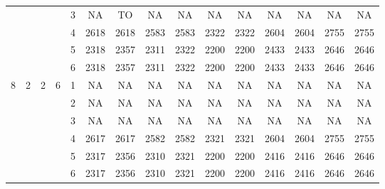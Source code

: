 \begin{longtable}{|c|c|c|c|c|c c|c c|c c|c c|c c|}
 & & & & 3 & NA & TO & NA & NA & NA & NA & NA & NA & NA & NA \\
 & & & & 4 & 2618 & 2618 & 2583 & 2583 & 2322 & 2322 & 2604 & 2604 & 2755 & 2755 \\
 & & & & 5 & 2318 & 2357 & 2311 & 2322 & 2200 & 2200 & 2433 & 2433 & 2646 & 2646 \\
 & & & & 6 & 2318 & 2357 & 2311 & 2322 & 2200 & 2200 & 2433 & 2433 & 2646 & 2646 \\
\hline
\multirow{6}{*}{8} & \multirow{6}{*}{2} & \multirow{6}{*}{2} & \multirow{6}{*}{6} & 1 & NA & NA & NA & NA & NA & NA & NA & NA & NA & NA \\
 & & & & 2 & NA & NA & NA & NA & NA & NA & NA & NA & NA & NA \\
 & & & & 3 & NA & NA & NA & NA & NA & NA & NA & NA & NA & NA \\
 & & & & 4 & 2617 & 2617 & 2582 & 2582 & 2321 & 2321 & 2604 & 2604 & 2755 & 2755 \\
 & & & & 5 & 2317 & 2356 & 2310 & 2321 & 2200 & 2200 & 2416 & 2416 & 2646 & 2646 \\
 & & & & 6 & 2317 & 2356 & 2310 & 2321 & 2200 & 2200 & 2416 & 2416 & 2646 & 2646 \\
\hline
\end{longtable}